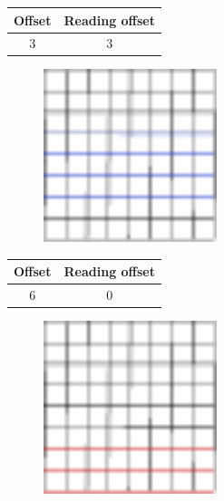 \documentclass{beamer}
\begin{document}
\begin{frame}{}
    \begin{table}
        \centering
        \begin{tabular}{|c|c|}
            \hline
            Offset & Reading offset \\
            \hline
            3 & 3 \\
            \hline
        \end{tabular}
    \end{table}
    \begin{figure}
        \centering
        \includegraphics[width=0.45\textwidth]{grid_3r_2_ro_2.pdf}
        \label{fig:grid_3r_2_ro_2}
    \end{figure}
\end{frame}

\begin{frame}{}
    \begin{table}
        \centering
        \begin{tabular}{|c|c|}
            \hline
            Offset & Reading offset \\
            \hline
            6 & 0 \\
            \hline
        \end{tabular}
    \end{table}
    \begin{figure}
        \centering
        \includegraphics[width=0.45\textwidth]{grid_3r_3.pdf}
        \label{fig:grid_3r_3}
    \end{figure}
\end{frame}
\end{document}
